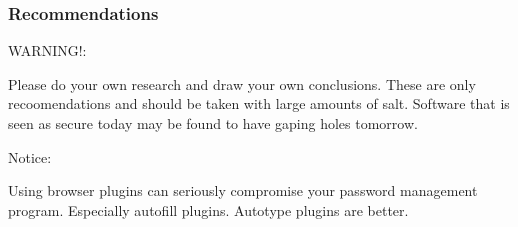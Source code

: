 \documentclass{beamer}
\begin{document}
\begin{frame}
  \frametitle{Recommendations}

  \begin{alertblock}{WARNING!:}

    Please do your own research and draw your own conclusions. These are only
    recoomendations and should be taken with large amounts of salt. Software
    that is seen as secure today may be found to have gaping holes tomorrow.

  \end{alertblock}

  \begin{alertblock}{Notice:}

    Using browser plugins can seriously compromise your password management
    program. Especially autofill plugins. Autotype plugins are better.

  \end{alertblock}


\end{frame}
\end{document}
